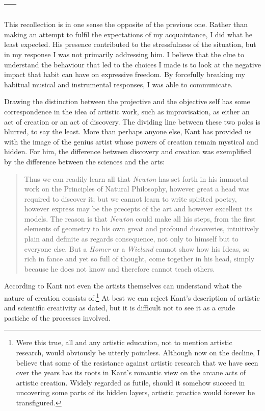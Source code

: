 \documentclass[a4paper]{article}
\begin{document}
\subsection*{---}

This recollection is in one sense the opposite of the previous one. Rather than making an attempt to fulfil the expectations of my acquaintance, I did what he least expected. His presence contributed to the stressfulness of the situation, but in my response I was not primarily addressing him. I believe that the clue to understand the behaviour that led to the choices I made is to look at the negative impact that habit can have on expressive freedom. By forcefully breaking my habitual musical and instrumental responses, I was able to communicate. 

Drawing the distinction between the projective and the objective self has some correspondence in the idea of artistic work, such as improvisation, as either an act of creation or an act of discovery. The dividing line between these two poles is blurred, to say the least. More than perhaps anyone else, Kant has provided us with the image of the genius artist whose powers of creation remain mystical and hidden. For him, the difference between discovery and creation was exemplified by the difference between the sciences and the arts:
\begin{quote}
Thus we can readily learn all that \emph{Newton} has set forth in his immortal work on the   Principles of Natural Philosophy, however great a head was required to discover it; but we   cannot learn to write spirited poetry, however express may be the precepts of the art and   however excellent its models. The reason is that \emph{Newton} could make all his steps, from   the first elements of geometry to his own great and profound discoveries, intuitively plain   and definite as regards consequence, not only to himself but to everyone else. But a   \emph{Homer} or a \emph{Wieland} cannot show how his Ideas, so rich in fance and yet so full of   thought, come together in his head, simply because he does not know and therefore cannot   teach others. \citep[][p. 113]{kant2007}
\end{quote}
According to Kant not even the artists themselves can understand what the nature of creation consists of.\footnote{Were this true, all and any artistic education, not to mention artistic research, would obviously be utterly pointless. Although now on the decline, I believe that some of the resistance against artistic research that we have seen over the years has its roots in Kant's romantic view on the arcane acts of artistic creation. Widely regarded as futile, should it somehow succeed in uncovering some parts of its hidden layers, artistic practice would forever be transfigured.} At best we can reject Kant's description of artistic and scientific creativity as dated, but it is difficult not to see it as a crude pastiche of the processes involved.
\end{document}
